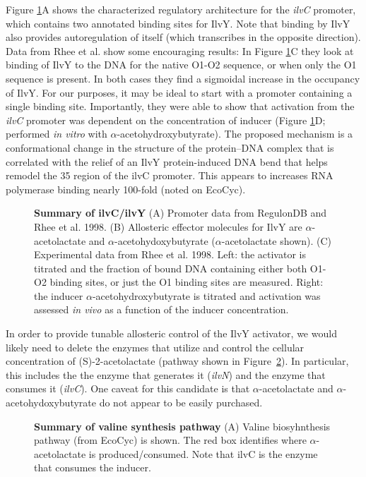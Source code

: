 \documentclass[12pt]{article}
\begin{document}
Figure \ref{ilvY}A shows the characterized regulatory architecture for the \textit{ilvC}
promoter, which contains two annotated binding sites for IlvY. Note that binding
by IlvY also provides autoregulation of itself (which transcribes in the
opposite direction). Data from Rhee et al. show some encouraging results: In
Figure \ref{ilvY}C they look at binding of IlvY to the DNA for the native O1-O2
sequence, or when only the O1 sequence is present. In both cases they find a
sigmoidal increase in the occupancy of IlvY. For our purposes, it may be ideal
to start with a promoter containing a single binding site. Importantly, they
were able to show that activation from the \textit{ilvC} promoter was dependent on the
concentration of inducer (Figure \ref{ilvY}D; performed \textit{in vitro} with
$\alpha$-acetohydroxybutyrate). The proposed mechanism is a conformational
change in the structure of the protein–DNA complex that is correlated with the
relief of an IlvY protein-induced DNA bend that helps remodel the  35 region of
the ilvC promoter. This appears to increases RNA polymerase binding nearly
100-fold (noted on EcoCyc).


\begin{figure}[ht!]
 \centering
 \caption{\textbf{Summary of ilvC/ilvY} (A) Promoter data from RegulonDB and Rhee et al. 1998. (B) Allosteric
 effector molecules for IlvY are $\alpha$-acetolactate and
 $\alpha$-acetohydoxybutyrate ($\alpha$-acetolactate shown). (C) Experimental data from
 Rhee et al. 1998. Left: the activator is titrated and the fraction of bound DNA containing either
 both O1-O2 binding sites, or just the O1 binding sites are measured. Right: the inducer
 $\alpha$-acetohydroxybutyrate is titrated and activation was assessed \textit{in vivo} as a
 function of the inducer concentration.}
 \label{ilvY}
\end{figure}

In order to provide tunable allosteric control of the IlvY activator, we would
likely need to delete the enzymes that utilize and control the cellular
concentration of (S)-2-acetolactate (pathway shown in Figure~\ref{ilvY_2}). In
particular, this includes the the enzyme that generates it (\textit{ilvN}) and the enzyme
that consumes it (\textit{ilvC}). One caveat for this candidate is that
$\alpha$-acetolactate and  $\alpha$-acetohydoxybutyrate do not appear to be
easily purchased.

\begin{figure}[ht!]
 \centering
 \caption{
       \textbf{Summary of valine synthesis pathway} (A) Valine biosyhnthesis pathway (from EcoCyc) is shown.
       The red box identifies where $\alpha$-acetolactate is produced/consumed. Note that ilvC
       is the enzyme that consumes the inducer.}
 \label{ilvY_2}
\end{figure}
\\
\end{document}
